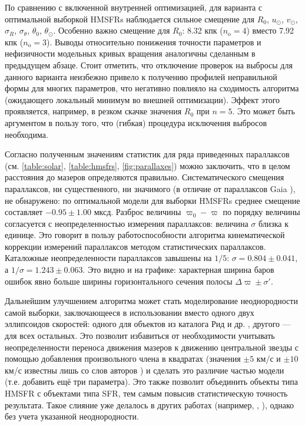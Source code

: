 \documentclass[a4paper, oneside, 14pt]{article}
\begin{document}
По сравнению с включенной внутренней оптимизацией, для варианта с оптимальной выборкой HMSFRs наблюдается сильное смещение для $ R_0 $, $ u_\odot $, $ v_\odot $, $ \sigma_R $, $ \sigma_\theta $, $ \theta_0 $, $ \theta_\odot $. Особенно важно смещение для $ R_0 $: 8.32 кпк ($ n_\text{o} = 4 $) вместо 7.92 кпк ($ n_\text{o} = 3 $). Выводы относительно понижения точности параметров
и нефизичности модельных кривых вращения аналогичны сделанным в предыдущем абзаце. Стоит отметить, что отключение проверок на выбросы для данного варианта неизбежно привело к получению профилей неправильной формы для многих параметров, что негативно повлияло на сходимость алгоритма (ожидающего локальный минимум во внешней оптимизации). Эффект этого проявляется, например, в резком скачке значения $ R_0 $ при $ n = 5 $. Это может быть аргументом в пользу того, что (гибкая) процедура исключения выбросов необходима.

Согласно полученным значениям статистик для ряда приведенных параллаксов (см. \autoref{table:solar}, \autoref{table:hmsfrs}, \autoref{fig:parallaxes}) можно заключить, что в целом расстояния до мазеров определяются правильно. Систематического смещения параллаксов, ни существенного, ни значимого (в отличие от параллаксов Gaia \cite{B.2021}), не обнаружено: по оптимальной модели для выборки HMSFRs среднее смещение составляет $ -0.95 \pm 1.00 $ мксд. Разброс величины $ \varpi_0 - \varpi $ по порядку величины согласуется с неопределенностью измерения параллаксов: величина $ \sigma $ близка к единице. Это говорит в пользу работоспособности алгоритма кинематической коррекции измерений параллаксов методом статистических параллаксов. Каталожные неопределенности параллаксов завышены на $ 1 / 5 $: $ \sigma = 0.804 \pm 0.041 $, а $ 1 / \sigma = 1.243 \pm 0.063 $. Это видно и на графике: характерная ширина баров ошибок явно больше ширины горизонтального сечения полосы $ \Delta\varpi \pm \sigma' $.

Дальнейшим улучшением алгоритма может стать моделирование неоднородности самой выборки, заключающееся в использовании вместо одного двух эллипсоидов скоростей: одного для объектов из каталога Рид и др. \cite{R.2019}, другого --- для всех остальных. Это позволит избавиться от необходимости учитывать неопределенности переноса движения мазеров к движению центральной звезды с помощью добавления произвольного члена в квадратах (значения $ \pm 5 $ км/с и $ \pm 10 $ км/с известны лишь со слов авторов \cite{R.2019}) и сделать это различие частью модели (т.е. добавить ещё три параметра). Это также позволит объединить объекты типа HMSFR с объектами типа SFR, тем самым повысив статистическую точность результата. Такое слияние уже делалось в других работах (например, \cite{R.2017}, \cite{VERA.2020}), однако без учета указанной неоднородности.
\end{document}
